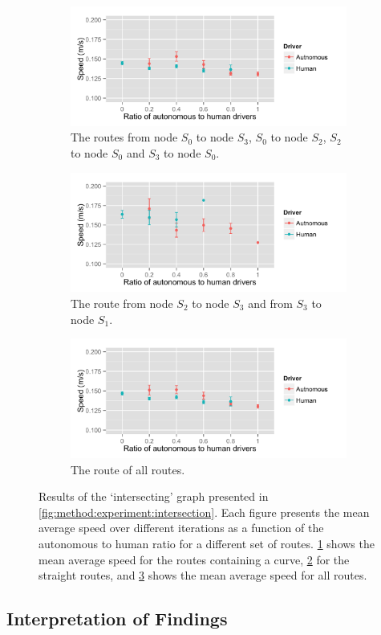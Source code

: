 \begin{figure}
	\centering
	\begin{subfigure}{\textwidth}
		\centering
		\includegraphics[width=\textwidth]{./img/intersecting_03_01}
		\caption{The routes from node $S_0$ to node $S_3$, $S_0$ to node $S_2$, $S_2$ to node $S_0$ and $S_3$ to node $S_0$.}
		\label{fig:results:intersecting:03}
	\end{subfigure}
	\begin{subfigure}{\textwidth}
		\centering
		\includegraphics[width=\textwidth]{./img/intersecting_13}
		\caption{The route from node $S_2$ to node $S_3$ and from $S_3$ to node $S_1$.}
		\label{fig:results:intersecting:13}
	\end{subfigure}	
	\begin{subfigure}{\textwidth}
		\centering
		\includegraphics[width=\textwidth]{./img/intersecting}
		\caption{The route of all routes.}
		\label{fig:results:intersecting:all}
	\end{subfigure}		
	\caption{Results of the `intersecting' graph presented in \cref{fig:method:experiment:intersection}. Each figure presents the mean average speed over different iterations as a function of the autonomous to human ratio for a different set of routes. \ref{fig:results:intersecting:03} shows the mean average speed for the routes containing a curve, \ref{fig:results:intersecting:13} for the straight routes, and \ref{fig:results:intersecting:all} shows the mean average speed for all routes.}
	\label{fig:results:intersecting}
\end{figure}

\subsection{Interpretation of Findings}
\label{sub:results:interpretation}
